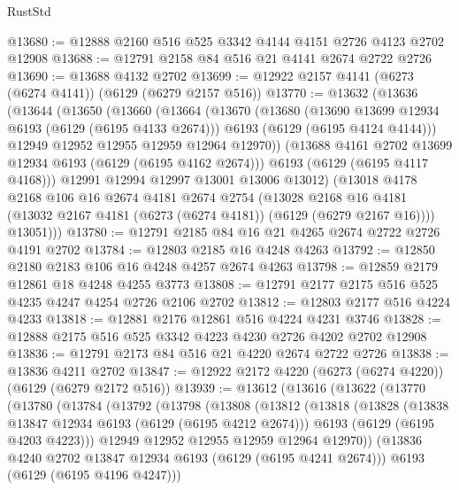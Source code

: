 \begin{lexlean}{RustStd}
\begin{coremodule}
@13680 := @12888 @2160 @516 @525 @3342 @4144 @4151 @2726 @4123 @2702 @12908
@13688 := @12791 @2158 @84 @516 @21 @4141 @2674 @2722 @2726
@13690 := @13688 @4132 @2702
@13699 := @12922 @2157 @4141 (@6273 (@6274 @4141)) (@6129 (@6279 @2157 @516))
@13770 := @13632
    (@13636
      (@13644
        (@13650
          (@13660
            (@13664
              (@13670
                (@13680
                  (@13690 @13699 @12934 @6193 (@6129 (@6195 @4133 @2674)))
                  @6193
                  (@6129 (@6195 @4124 @4144)))
                @12949
                @12952
                @12955
                @12959
                @12964
                @12970))
            (@13688 @4161 @2702 @13699 @12934 @6193 (@6129 (@6195 @4162 @2674)))
            @6193
            (@6129 (@6195 @4117 @4168)))
          @12991
          @12994
          @12997
          @13001
          @13006
          @13012)
        (@13018
          @4178
          @2168
          @106
          @16
          @2674
          @4181
          @2674
          @2754
          (@13028
            @2168
            @16
            @4181
            (@13032 @2167 @4181 (@6273 (@6274 @4181)) (@6129 (@6279 @2167 @16))))
          @13051)))
@13780 := @12791 @2185 @84 @16 @21 @4265 @2674 @2722 @2726 @4191 @2702
@13784 := @12803 @2185 @16 @4248 @4263
@13792 := @12850 @2180 @2183 @106 @16 @4248 @4257 @2674 @4263
@13798 := @12859 @2179 @12861 @18 @4248 @4255 @3773
@13808 := @12791 @2177 @2175 @516 @525 @4235 @4247 @4254 @2726 @2106 @2702
@13812 := @12803 @2177 @516 @4224 @4233
@13818 := @12881 @2176 @12861 @516 @4224 @4231 @3746
@13828 := @12888 @2175 @516 @525 @3342 @4223 @4230 @2726 @4202 @2702 @12908
@13836 := @12791 @2173 @84 @516 @21 @4220 @2674 @2722 @2726
@13838 := @13836 @4211 @2702
@13847 := @12922 @2172 @4220 (@6273 (@6274 @4220)) (@6129 (@6279 @2172 @516))
@13939 := @13612
    (@13616
      (@13622
        (@13770
          (@13780
            (@13784
              (@13792
                (@13798
                  (@13808
                    (@13812
                      (@13818
                        (@13828
                          (@13838 @13847 @12934 @6193 (@6129 (@6195 @4212 @2674)))
                          @6193
                          (@6129 (@6195 @4203 @4223)))
                        @12949
                        @12952
                        @12955
                        @12959
                        @12964
                        @12970))
                    (@13836 @4240 @2702 @13847 @12934 @6193 (@6129 (@6195 @4241 @2674)))
                    @6193
                    (@6129 (@6195 @4196 @4247)))

\end{coremodule}
\end{lexlean}
